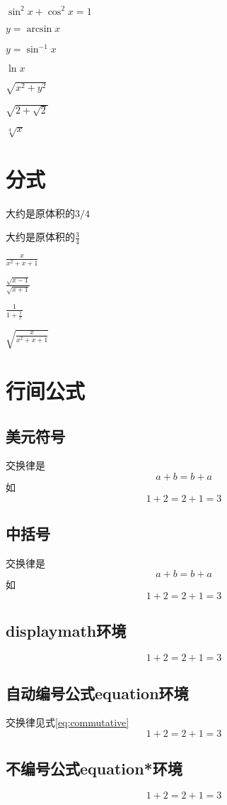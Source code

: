 \documentclass{article}
\begin{document}
	$\sin^2 x+ \cos^2 x = 1 $
	
	$y = \arcsin x$
	
	$y = \sin ^{-1} x$
	
	$\ln x$
	
	$\sqrt{x^2 + y^2}$ 
	
	$\sqrt{2 + \sqrt{2}}$
	
	$\sqrt[4]{x}$
	\section{分式}
	大约是原体积的$3/4$
	
	大约是原体积的$\frac{3}{4}$
	
	$\frac{x}{x^2 + x +1}$
	
	$\frac{\sqrt{x-1}}{\sqrt{x+1}}$
	
	$\frac{1}{1+\frac{1}{x}}$
	
	$\sqrt{\frac{x}{x^2 + x +1}}$
	\section{行间公式}
	\subsection{美元符号}
	交换律是 
	$$a + b =b + a$$
	如 
	$$1 + 2 =2 +1 =3$$
	\subsection{中括号}
	交换律是
	\[a + b =b + a\]
	如 
	\[1 + 2 =2 +1 =3\]
	\subsection{displaymath环境}
	\begin{displaymath}
	1 + 2 =2 +1 =3
	\end{displaymath}
	\subsection{自动编号公式equation环境}
	交换律见式\ref{eq:commutative}
	\begin{equation}
		1 + 2 =2 +1 =3 \label{eq:commutative}
	\end{equation}
	\subsection{不编号公式equation*环境} %
		\begin{equation*}
			1 + 2 =2 +1 =3
		\end{equation*}
	
	
\end{document}
